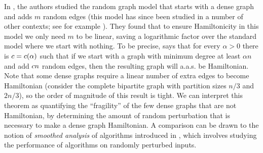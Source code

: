 \documentclass[11pt,english]{article}
\theoremstyle{plain}
\theoremstyle{definition}
\theoremstyle{definition}
\theoremstyle{plain}
\theoremstyle{plain}
\theoremstyle{plain}
\theoremstyle{plain}
\theoremstyle{remark}
\theoremstyle{remark}
\let\originalleft\left
\let\originalright\right
\renewcommand{\left}{\mathopen{}\mathclose\bgroup\originalleft}
\renewcommand{\right}{\aftergroup\egroup\originalright}
\begin{document}
In \cite{BFM03}, the authors studied the random graph model that
starts with a dense graph and adds $m$ random edges (this model has
since been studied in a number of other contexts; see for example
\cite{BHM04,KST06}). They found that to ensure Hamiltonicity in this
model we only need $m$ to be linear, saving a logarithmic factor
over the standard model where we start with nothing. To be precise,
\cite[Theorem~1]{BFM03} says that for every $\alpha>0$ there is
$\cdi=\cdi\left(\alpha\right)$ such that if we start with a graph with
minimum degree at least $\alpha n$ and add $c n$
random edges, then the resulting graph will a.a.s. be Hamiltonian.
Note that some dense graphs require a linear number of extra edges
to become Hamiltonian (consider the complete bipartite graph with
partition sizes $n/3$ and $2n/3$), so the order of magnitude of this result is tight. We can interpret this theorem as quantifying the ``fragility''
of the few dense graphs that are not Hamiltonian, by determining the
amount of random perturbation that is necessary to make a dense graph
Hamiltonian. A comparison can be drawn to the notion of \emph{smoothed
analysis} of algorithms introduced in \cite{ST04}, which involves
studying the performance of algorithms on randomly perturbed inputs.
\end{document}
